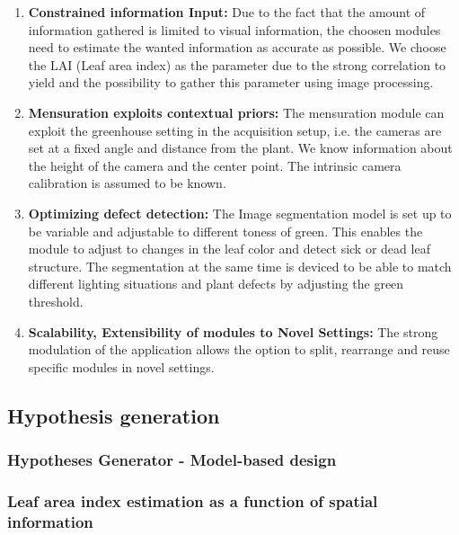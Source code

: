 \begin{enumerate}
    \item \textbf{Constrained information Input:} Due to the fact that the amount of information gathered is limited to visual information, the choosen modules need to estimate the wanted information as accurate as possible. We choose the LAI (Leaf area index) as the parameter due to the strong correlation to yield \cite{heuvelink2004effect} and the possibility to gather this parameter using image processing.

    \item \textbf{Mensuration exploits contextual priors:} The mensuration module can exploit the greenhouse setting in the acquisition setup, i.e. the cameras are set at a fixed angle and distance from the plant. We know information about the height of the camera and the center point. The intrinsic camera calibration is assumed to be known.

    \item \textbf{Optimizing defect detection:} The Image segmentation model is set up to be variable and adjustable to different toness of green. This enables the module to adjust to changes in the leaf color and detect sick or dead leaf structure. The segmentation at the same time is deviced to be able to match different lighting situations and plant defects by adjusting the green threshold.

    \item \textbf{Scalability, Extensibility of modules to Novel Settings:} The strong modulation of the application allows the option to split, rearrange and reuse specific modules in novel settings.
\end{enumerate}

\subsection{Hypothesis generation}

\subsubsection{Hypotheses Generator - Model-based design}

\subsubsection{Leaf area index estimation as a function of spatial information}


